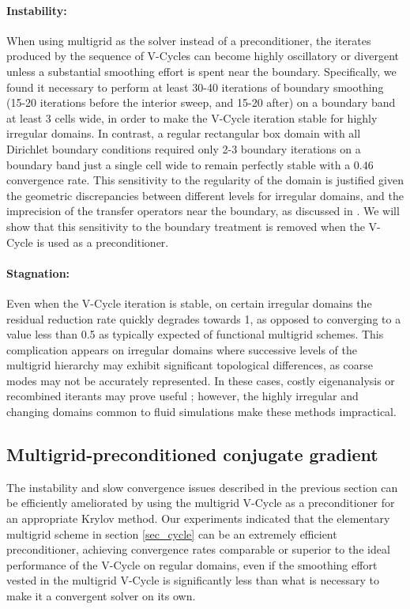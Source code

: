 \paragraph{Instability:} When using multigrid as the solver instead of a preconditioner, the iterates produced by the sequence of V-Cycles can become highly oscillatory or divergent unless a substantial smoothing effort is spent near the
boundary. Specifically, we found it necessary to perform at least 30-40 iterations of boundary smoothing (15-20 iterations before the interior sweep, and 15-20 after) on a boundary band
at least 3 cells wide, in order to make the V-Cycle iteration stable for highly irregular domains. In contrast, a regular rectangular box domain with all Dirichlet boundary conditions
required only 2-3 boundary iterations on a boundary band just a single cell wide to remain perfectly stable with a $0.46$ convergence rate. This sensitivity to the regularity of the
domain is justified given the geometric discrepancies between different levels for irregular domains, and the imprecision of the transfer operators near the boundary, as discussed in \cite{trottenberg:2001:multigrid}. We will show that this sensitivity to the boundary treatment is removed when the V-Cycle is used as a preconditioner.

\paragraph{Stagnation:} Even when the V-Cycle iteration is stable, on certain irregular domains the residual reduction rate quickly degrades towards 1, as opposed to converging to a value
less than 0.5 as typically expected of functional multigrid schemes. This complication appears on irregular domains where successive levels of the multigrid hierarchy may exhibit
significant topological differences, as coarse modes may not be accurately represented.  In these cases,  costly eigenanalysis or recombined iterants may prove useful \cite{trottenberg:2001:multigrid}; however, the highly irregular and changing domains common to fluid simulations make these methods impractical.

\subsection{Multigrid-preconditioned conjugate gradient}
\label{subsec_mgpcg}
The instability and slow convergence issues described in the previous section can be efficiently ameliorated by using the multigrid V-Cycle as a preconditioner for an appropriate Krylov method. 
Our experiments indicated that the elementary multigrid scheme in section \ref{sec_cycle} can be an extremely efficient preconditioner, achieving
convergence rates comparable or superior to the ideal performance of the V-Cycle on regular domains, even if the smoothing effort vested in the multigrid V-Cycle is significantly less than what is necessary
to make it a convergent solver on its own.

